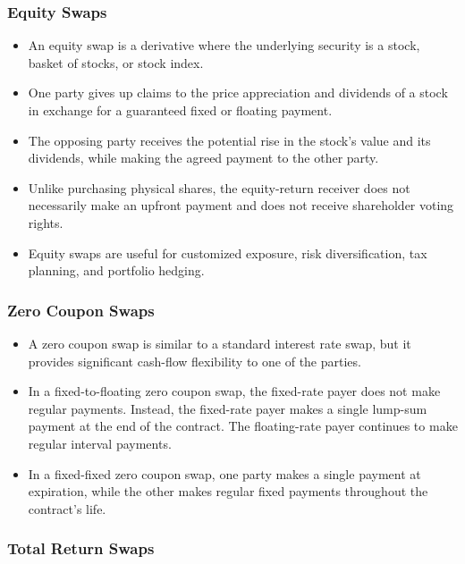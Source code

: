 \documentclass[12pt,openany]{book}
\begin{document}
\subsubsection{Equity Swaps}

\begin{itemize}[leftmargin=*]
    \item An equity swap is a derivative where the underlying security is a stock, basket of stocks, or stock index.
    \item One party gives up claims to the price appreciation and dividends of a stock in exchange for a guaranteed fixed or floating payment.
    \item The opposing party receives the potential rise in the stock's value and its dividends, while making the agreed payment to the other party.
    \item Unlike purchasing physical shares, the equity-return receiver does not necessarily make an upfront payment and does not receive shareholder voting rights.
    \item Equity swaps are useful for customized exposure, risk diversification, tax planning, and portfolio hedging.
\end{itemize}

\subsubsection{Zero Coupon Swaps}

\begin{itemize}[leftmargin=*]
    \item A zero coupon swap is similar to a standard interest rate swap, but it provides significant cash-flow flexibility to one of the parties.
    \item In a fixed-to-floating zero coupon swap, the fixed-rate payer does not make regular payments. Instead, the fixed-rate payer makes a single lump-sum payment at the end of the contract. The floating-rate payer continues to make regular interval payments.
    \item In a fixed-fixed zero coupon swap, one party makes a single payment at expiration, while the other makes regular fixed payments throughout the contract's life.
\end{itemize}

\subsubsection{Total Return Swaps}
\end{document}
